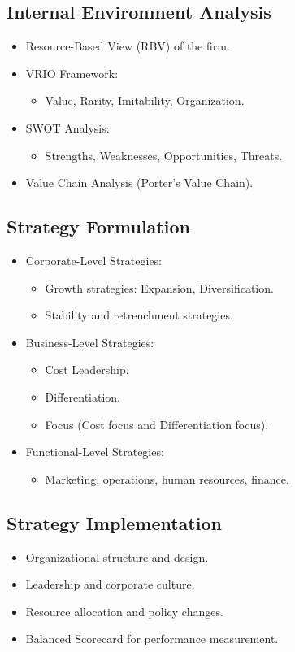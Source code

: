 \subsection{Internal Environment Analysis}
\begin{itemize}
    \item Resource-Based View (RBV) of the firm.
    \item VRIO Framework:
    \begin{itemize}
        \item Value, Rarity, Imitability, Organization.
    \end{itemize}
    \item SWOT Analysis:
    \begin{itemize}
        \item Strengths, Weaknesses, Opportunities, Threats.
    \end{itemize}
    \item Value Chain Analysis (Porter’s Value Chain).
\end{itemize}

\subsection{Strategy Formulation}
\begin{itemize}
    \item Corporate-Level Strategies:
    \begin{itemize}
        \item Growth strategies: Expansion, Diversification.
        \item Stability and retrenchment strategies.
    \end{itemize}
    \item Business-Level Strategies:
    \begin{itemize}
        \item Cost Leadership.
        \item Differentiation.
        \item Focus (Cost focus and Differentiation focus).
    \end{itemize}
    \item Functional-Level Strategies:
    \begin{itemize}
        \item Marketing, operations, human resources, finance.
    \end{itemize}
\end{itemize}

\subsection{Strategy Implementation}
\begin{itemize}
    \item Organizational structure and design.
    \item Leadership and corporate culture.
    \item Resource allocation and policy changes.
    \item Balanced Scorecard for performance measurement.
\end{itemize}

